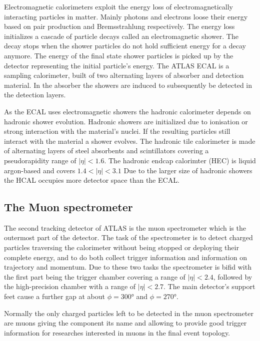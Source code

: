 Electromagnetic calorimeters exploit the energy loss of electromagnetically interacting particles in matter. Mainly photons and electrons loose their energy based on pair production and Bremsstrahlung respectively. The energy loss initializes a cascade of particle decays called an electromagnetic shower. The decay stops when the shower particles do not hold sufficient energy for a decay anymore. The energy of the final state shower particles is picked up by the detector representing the initial particle's energy.
The ATLAS ECAL is a sampling calorimeter, built of two alternating layers of absorber and detection material. In the absorber the showers are induced to subsequently be detected in the detection layers.


As the ECAL uses electromagnetic showers the hadronic calorimeter depends on hadronic shower evolution. Hadronic showers are initialized due to ionisation or strong interaction with the material's nuclei. If the resulting particles still interact with the material a shower evolves.
The hadronic tile calorimeter is made of alternating layers of steel absorbents and scintillators covering a pseudorapidity range of $|\eta| < 1.6$.
The hadronic endcap calorimter (HEC) is liquid argon-based and covers $1.4 < |\eta| < 3.1$
Due to the larger size of hadronic showers the HCAL occupies more detector space than the ECAL.


\subsection{The Muon spectrometer}

The second tracking detector of ATLAS is the muon spectrometer which is the outermost part of the detector. The task of the spectrometer is to detect charged particles traversing the calorimeter without being stopped or deploying their complete energy, and to do both collect trigger information and information on trajectory and momentum. Due to these two tasks the spectrometer is bifid with the first part being the trigger chamber covering a range of $|\eta|<2.4$, followed by the high-precision chamber with a range of $|\eta|<2.7$. The main detector's support feet cause a further gap at about $\phi = \ang{300}$ and $\phi = \ang{270}$.

Normally the only charged particles left to be detected in the muon spectrometer are muons giving the component its name and allowing to provide good trigger information for researches interested in muons in the final event topology.






